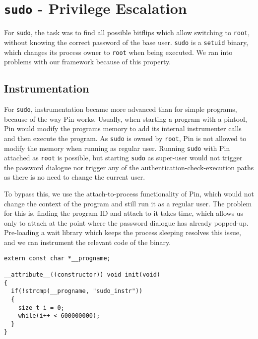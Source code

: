 \section{\texttt{sudo} - Privilege Escalation}

For \texttt{sudo}, the task was to find all possible bitflips which allow
switching to \texttt{root}, without knowing the correct password of the base
user. \texttt{sudo} is a \texttt{setuid} binary, which changes its process
owner to \texttt{root} when being executed. We ran into problems with our
framework because of this property.

\subsection{Instrumentation}

For \texttt{sudo}, instrumentation became more advanced than for simple
programs, because of the way Pin works. Usually, when starting a program with a
pintool, Pin would modify the program\textquotesingle s memory to add its
internal instrumenter calls and then execute the program. As \texttt{sudo} is
owned by \texttt{root}, Pin is not allowed to modify the memory when running as
regular user. Running \texttt{sudo} with Pin attached as \texttt{root} is
possible, but starting \texttt{sudo} as super-user would not trigger the
password dialogue nor trigger any of the authentication-check-execution paths
as there is no need to change the current user.

To bypass this, we use the attach-to-process functionality of Pin, which
would not change the context of the program and still run it as a regular user.
The problem for this is, finding the program ID and attach to it takes time,
which allows us only to attach at the point where the password dialogue has
already popped-up. Pre-loading a wait library which keeps the process sleeping
resolves this issue, and we can instrument the relevant code of the binary.

\begin{minipage}{\linewidth}
\begin{lstlisting}[style=CStyle,
                   caption={Code of the pre-loaded library to keep the process
waiting for some milliseconds, which gives enough time for Pin to attach to the
process.},
label=lst:presleeplib]
extern const char *__progname;

__attribute__((constructor)) void init(void)
{
  if(!strcmp(__progname, "sudo_instr"))
  {
    size_t i = 0;
    while(i++ < 600000000);
  }
}
\end{lstlisting}
\end{minipage}

